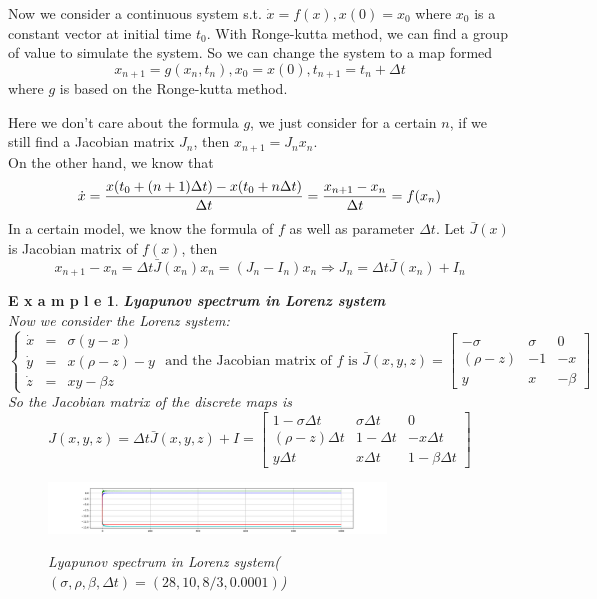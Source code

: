 \documentclass[12pt]{article}
\theoremstyle{plain}
\newtheorem{example}{\textbf{E x a m p l e}}[section]
\begin{document}
Now we consider a continuous system s.t. $\dot x = f(x), x(0) = x_0$ where $x_0$ is a constant vector at initial time $t_0$. With Ronge-kutta method, we can find a group of value to simulate the system. So we can change the system to a map formed 
$$
x_{n+1} = g(x_n, t_n), x_0 = x(0), t_{n+1} = t_n + \Delta t
$$
where $g$ is based on the Ronge-kutta method. 



  \noindent Here we don't care about the formula $g$, we just consider for a certain $n$, if we still find a Jacobian matrix $J_n$, then $x_{n+1} = J_n x_n$.
\\\noindent On the other hand, we know that 
$$
\dot x = {x(t_0+(n+1)\Delta t) - x(t_0+n\Delta t) \over \Delta t} = {x_{n+1} - x_n \over \Delta t} = f(x_n)
$$
            In a certain model, we know the formula of $f$ as well as parameter $\Delta t$. Let $\bar J(x)$ is Jacobian matrix of $f(x)$, then
$$
x_{n+1} - x_n = \Delta t \bar J(x_n)x_n = (J_n - I_n) x_n \Rightarrow J_n = \Delta t\bar J(x_n) + I_n
$$



\begin{example}\textbf{Lyapunov spectrum in Lorenz system}
\\\noindent Now we consider the Lorenz system:
$$
\left\{\begin{array}{lll}
\dot x & = & \sigma(y - x) \\
\dot y & = & x(\rho - z) - y \\
\dot z & = & xy - \beta z
\end{array}\right. \text{ and the Jacobian matrix of $f$ is } \bar J(x, y, z) = \left[\begin{array}{lll}
-\sigma     & \sigma    & 0         \\
(\rho-z)    & -1        & -x        \\
y           & x         & -\beta
\end{array}\right]
$$
So the Jacobian matrix of the discrete maps is 
$$
J(x, y, z) = \Delta t\bar J(x, y, z) + I = \left[\begin{array}{lll}
1 - \sigma \Delta t     & \sigma \Delta t       & 0                     \\
(\rho-z) \Delta t       & 1 -\Delta t           & -x\Delta t            \\
y\Delta t               & x\Delta t             & 1 -\beta \Delta t
\end{array}\right]
$$
\begin{figure}[H]
\begin{center}
\includegraphics[width=0.8\textwidth]{figure/section5/Lya-spe-Lorenz-1.png} \\
\caption{Lyapunov spectrum in Lorenz system($(\sigma, \rho, \beta, \Delta t) = (28, 10, 8/3, 0.0001)$)}
\end{center}
\end{figure}
\end{example}
\end{document}
